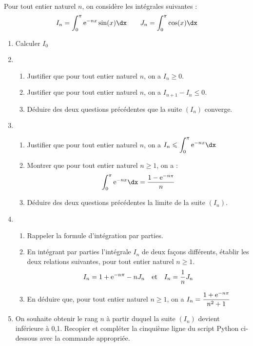 \documentclass[11pt,fleqn, openany]{book} %
\begin{document}
\begin{exercise}[subtitle={(Amérique du Nord 2024)}]

Pour tout entier naturel $n$, on considère les intégrales suivantes :
\[I_n = \displaystyle\int_0^{\pi}\e^{-nx}\sin(x)\dx \qquad J_n=\displaystyle\int_0^{\pi}\cos(x)\dx\]

\begin{enumerate}
\item Calculer $I_0$
\vskip10pt
\item \begin{enumerate}
\item Justifier que pour tout entier naturel $n$, on a $I_n \geqslant 0$.
\item Justifier que pour tout entier naturel $n$, on a $I_{n+1}-I_n \leqslant 0$.
\item Déduire des deux questions précédentes que la suite $(I_n)$ converge.\end{enumerate}
\vskip10pt
\item \begin{enumerate} \item Justifier que pour tout entier naturel $n$, on a $I_n \leqslant \displaystyle\int_0^{\pi} \e^{-nx}\dx$
\item Montrer que pour tout entier naturel $n\geqslant 1$, on a :
\[\displaystyle\int_0^{\pi}\e^{-nx}\dx=\dfrac{1-\e^{-n\pi}}{n}\]
\item Déduire des deux questions précédentes la limite de la suite $(I_n)$. \end{enumerate}
\vskip10pt
\item \begin{enumerate} \item Rappeler la formule d'intégration par parties.
\item En intégrant par parties l'intégrale $I_n$ de deux façons différents, établir les deux relations suivantes, pour tout entier naturel $n\geqslant 1$.
\[I_n=1+\mathrm{e}^{-n\pi}-nJ_n \quad\text{et}\quad I_n=\dfrac{1}{n}J_n\]
\item En déduire que, pour tout entier naturel $n\geqslant 1$, on a $I_n=\dfrac{1+\mathrm{e}^{-n\pi}}{n^2+1}$\end{enumerate}
\item On souhaite obtenir le rang $n$ à partir duquel la suite $(I_n)$ devient inférieure à 0,1. Recopier et compléter la cinquième ligne du script Python ci-dessous avec la commande appropriée.

\end{enumerate}
\newpage
\end{exercise}
\end{document}
